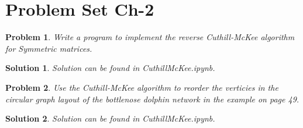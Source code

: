 \documentclass{article}
\newtheorem*{problem}{Problem}
\newtheorem*{solution}{Solution}
\begin{document}
\section*{Problem Set Ch-2}

\begin{problem}{2.5}
    Write a program to implement the reverse Cuthill-McKee algorithm for Symmetric matrices.
\end{problem}

\begin{solution}
    Solution can be found in CuthillMcKee.ipynb.
\end{solution}

\begin{problem}{2.6}
    Use the Cuthill-McKee algorithm to reorder the verticies in the circular
    graph layout of the bottlenose dolphin network in the example on page 49.
\end{problem}

\begin{solution}
    Solution can be found in CuthillMcKee.ipynb.
\end{solution}
\end{document}
